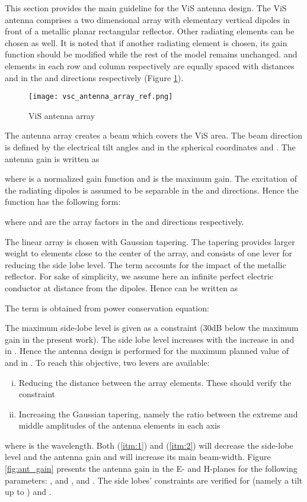 \documentclass[conference]{IEEEtran}
\begin{document}
	This section provides the main guideline for the \ac{ViS} antenna design. The \ac{ViS} antenna comprises a two dimensional array with  elementary vertical dipoles in front of a metallic planar rectangular reflector. Other radiating elements can be chosen as well. It is noted that if another radiating element is chosen, its gain function should be modified while the rest of the model remains unchanged.  and   elements in each row and column respectively are equally spaced with distances  and   in the  and  directions respectively (Figure \ref{fig:ant_array}).

\begin{figure}[!ht]
\centering
\texttt{[image: vsc\_antenna\_array\_ref.png]}
\caption{\ac{ViS} antenna array}
\label{fig:ant_array}
\end{figure}

The antenna array creates a beam which covers the \ac{ViS} area. The beam direction is defined by the electrical tilt angles   and  in the spherical coordinates  and . The antenna gain is written as
	
	where  is a normalized gain function and  is the maximum gain. The excitation of the radiating dipoles is assumed to be separable in the  and  directions. Hence the function  has the following form:

where  and  are the array factors in the  and  directions respectively.

	The linear array is chosen with Gaussian tapering. The tapering provides larger weight to elements close to the center of the array, and consists of one lever for reducing the side lobe level. The term  accounts for the impact of the metallic reflector. For sake of simplicity, we assume here an infinite perfect electric conductor at distance  from the dipoles. Hence  can be written as



	The term  is obtained from power conservation equation:
	

	The maximum side-lobe level is given as a constraint (30dB below the maximum gain in the present work). The side lobe level increases with the increase in   and in . Hence the antenna design is performed for the maximum planned value of   and in . To reach this objective, two levers are available:
	\begin{enumerate}[(i)]
	\item Reducing the distance between the array elements. These should verify the constraint  \label{itm:1}
	\item Increasing the Gaussian tapering, namely the ratio between the extreme and middle amplitudes of the antenna elements in each axis \label{itm:2}
	\end{enumerate}
	where  is the wavelength. Both (\ref{itm:1}) and (\ref{itm:2}) will decrease the side-lobe level and the antenna gain and will increase its main beam-width. Figure \ref{fig:ant_gain} presents the antenna gain in the E- and H-planes for the following parameters: , and ,  and . The side lobes' constraints are verified for    (namely a tilt up to ) and .
\end{document}
